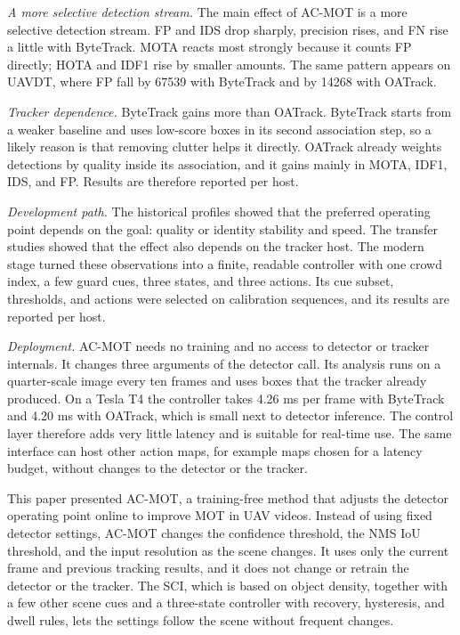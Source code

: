 \documentclass[pdflatex,sn-mathphys-num,iicol]{sn-jnl}
\makeatletter
\def\sectionfont{\reset@font\fontfamily{\rmdefault}\fontsize{11bp}{13bp}\bfseries\selectfont\raggedright\boldmath}
\renewcommand\section{\@startsection{section}{1}{\z@}{-8pt \@plus -2pt \@minus -2pt}{4pt}{\sectionfont}}
\makeatother
\begin{document}
\emph{A more selective detection stream.} The main effect of AC-MOT is a more
selective detection stream. FP and IDS drop sharply, precision rises, and FN
rise a little with ByteTrack. MOTA reacts most strongly because it counts FP
directly; HOTA and IDF1 rise by smaller amounts. The same pattern appears on
UAVDT, where FP fall by 67539 with ByteTrack and by 14268 with OATrack.

\emph{Tracker dependence.} ByteTrack gains more than OATrack. ByteTrack starts
from a weaker baseline and uses low-score boxes in its second association
step, so a likely reason is that removing clutter helps it directly. OATrack
already weights detections by quality inside its association, and it gains
mainly in MOTA, IDF1, IDS, and FP. Results are therefore reported per host.

\emph{Development path.} The historical profiles showed that the preferred
operating point depends on the goal: quality or identity stability and speed.
The transfer studies showed that the effect also depends on the tracker host.
The modern stage turned these observations into a finite, readable controller
with one crowd index, a few guard cues, three states, and three actions. Its
cue subset, thresholds, and actions were selected on calibration sequences,
and its results are reported per host.

\emph{Deployment.} AC-MOT needs no training and no access to detector or
tracker internals. It changes three arguments of the detector call. Its
analysis runs on a quarter-scale image every ten frames and uses boxes that
the tracker already produced. On a Tesla T4 the controller takes 4.26 ms per
frame with ByteTrack and 4.20 ms with OATrack, which is small next to detector
inference. The control layer therefore adds very little latency and is
suitable for real-time use. The same interface can host other action maps, for
example maps chosen for a latency budget, without changes to the detector or
the tracker.
\section{Conclusion}\label{sec:conclusion}

This paper presented AC-MOT, a training-free method that adjusts the detector
operating point online to improve MOT in UAV videos. Instead of using fixed
detector settings, AC-MOT changes the confidence threshold, the NMS IoU
threshold, and the input resolution as the scene changes. It uses only the
current frame and previous tracking results, and it does not change or retrain
the detector or the tracker. The SCI, which is based on object density,
together with a few other scene cues and a three-state controller with
recovery, hysteresis, and dwell rules, lets the settings follow the scene
without frequent changes.
\end{document}
